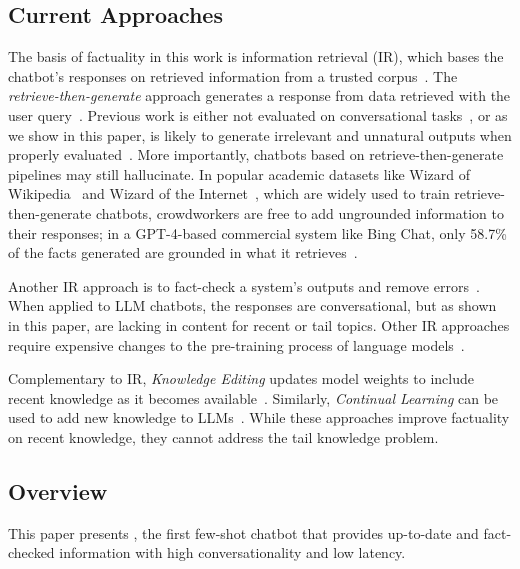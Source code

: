 \subsection{Current Approaches}
The basis of factuality in this work is information retrieval (IR), which bases the chatbot's responses on retrieved information from a trusted corpus~\cite{zhang2023large,   li2022survey, shuster-etal-2021-retrieval-augmentation}. The \emph{retrieve-then-generate} approach generates a response from data retrieved with the user query~\cite{lewis2020retrieval, trivedi-etal-2023-interleaving, izacard2022atlas, shuster2022blenderbot, chen2021blenderbot}. Previous work is either not evaluated on conversational tasks~\cite{lewis2020retrieval, trivedi-etal-2023-interleaving, shi2023replug}, or as we show in this paper, is likely to generate irrelevant and unnatural outputs when properly evaluated~\cite{izacard2022atlas}.
More importantly, chatbots based on retrieve-then-generate pipelines may still hallucinate. In popular academic datasets like Wizard of Wikipedia~\cite{dinan2019wizard} and Wizard of the Internet~\cite{komeili-etal-2022-internet}, which are widely used to train retrieve-then-generate chatbots, crowdworkers are free to add ungrounded information to their responses; in a GPT-4-based commercial system like Bing Chat, only 58.7\% of the facts generated are grounded in what it retrieves~\cite{bingchat2023}.

Another IR approach is to fact-check a system's outputs and remove errors~\cite{gao-etal-2023-rarr, jiang2023active}.
When applied to LLM chatbots, the responses are conversational, but as shown in this paper, are lacking in content for recent or tail topics.  Other IR approaches require expensive changes to the pre-training process of language models~\cite{lewis2020retrieval, realm2020}.

Complementary to IR, \emph{Knowledge Editing} updates model weights to include recent knowledge as it becomes available~\cite{de-cao-etal-2021-editing, meng2022locating, mitchell2022memory}.
Similarly, \emph{Continual Learning} can be used to add new knowledge to LLMs~\cite{jang-etal-2022-temporalwiki}. While these approaches improve factuality on recent knowledge, they cannot address the tail knowledge problem. 

\subsection{\system Overview}
\label{sec:overview}
This paper presents \system, the first few-shot chatbot that provides up-to-date and fact-checked information with high conversationality and low latency. 

